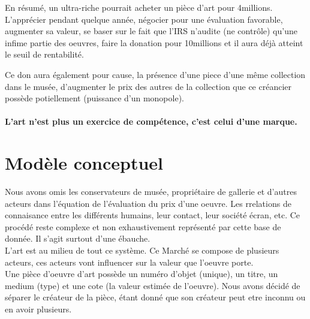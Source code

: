 \documentclass{article}
\begin{document}
        En résumé, un ultra-riche pourrait acheter un pièce d'art pour 4millions.
        L'apprécier pendant quelque année, négocier pour une évaluation favorable, augmenter sa valeur, se baser sur le fait que l'IRS n'audite (ne contrôle) qu'une infime partie des oeuvres, faire la donation pour 10millions et il aura déjà atteint le seuil de rentabilité.
        
        Ce don aura également pour cause, la présence d'une piece d'une même collection dans le musée, d'augmenter le prix des autres de la collection que ce créancier possède potiellement (puissance d'un monopole).

\paragraph{L'art n'est plus un exercice de compétence, c'est celui d'une marque.}


\section{Modèle conceptuel}

Nous avons omis les conservateurs de musée, propriétaire de gallerie et d'autres acteurs dans l'équation de l'évaluation du prix d'une oeuvre. Les rrelations de connaisance entre les différents humains, leur contact, leur société écran, etc. Ce procédé reste complexe et non exhaustivement représenté par cette base de donnée. Il s'agit surtout d'une ébauche.
\\

L'art est au milieu de tout ce système. 
Ce Marché se compose de plusieurs acteurs, ces acteurs vont influencer sur la valeur que l'oeuvre porte.
\\

Une pièce d'oeuvre d'art possède un numéro d'objet (unique), un titre, un medium (type) et une cote (la valeur estimée de l'oeuvre).
Nous avons décidé de séparer le créateur de la pièce, étant donné que son créateur peut etre inconnu ou en avoir plusieurs.
\\
\end{document}
